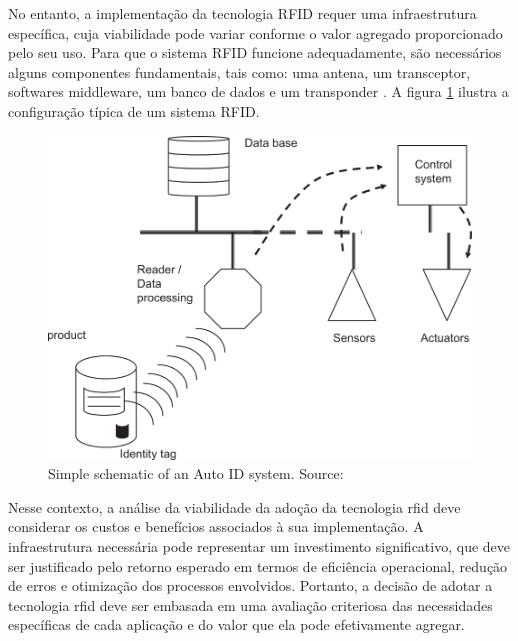 No entanto, a implementação da tecnologia RFID requer uma infraestrutura específica, cuja viabilidade pode variar conforme o valor agregado proporcionado pelo seu uso. Para que o sistema RFID funcione adequadamente, são necessários alguns componentes fundamentais, tais como: uma antena, um transceptor, softwares middleware, um banco de dados e um transponder \cite{MCFARLANE2003365}. A figura \ref{fig:rfid} ilustra a configuração típica de um sistema RFID. 

\begin{figure}[h!]
    \centering
    \includegraphics[width=.65\linewidth]{images/Development/chap3/g1126.png}
        \caption{Simple schematic of an Auto ID system. Source: \cite{MCFARLANE2003365}}

    \label{fig:rfid}
\end{figure}


Nesse contexto, a análise da viabilidade da adoção da tecnologia \acrshort{rfid} deve considerar os custos e benefícios associados à sua implementação. A infraestrutura necessária pode representar um investimento significativo, que deve ser justificado pelo retorno esperado em termos de eficiência operacional, redução de erros e otimização dos processos envolvidos. Portanto, a decisão de adotar a tecnologia \acrshort{rfid} deve ser embasada em uma avaliação criteriosa das necessidades específicas de cada aplicação e do valor que ela pode efetivamente agregar.

